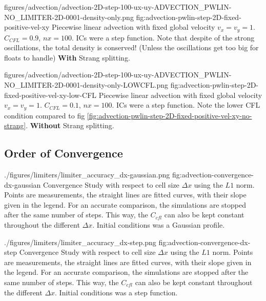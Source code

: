\quickfigcap
	{figures/advection/advection-2D-step-100-ux-uy-ADVECTION_PWLIN-NO_LIMITER-2D-0001-density-only.png}
	{fig:advection-pwlin-step-2D-fixed-positive-vel-xy}
	{	
		Piecewise linear advection with fixed global velocity $v_x = v_y = 1$. $C_{CFL} = 0.9$, $nx = 100$. 
		ICs were a step function. 
		Note that despite of the strong oscillations, the total density is conserved! 
		(Unless the oscillations get too big for floats to handle)
		\textbf{With} Strang splitting.
	}










\quickfigcap
	{figures/advection/advection-2D-step-100-ux-uy-ADVECTION_PWLIN-NO_LIMITER-2D-0001-density-only-LOWCFL.png}
	{fig:advection-pwlin-step-2D-fixed-positive-vel-xy-low-CFL}
	{
		Piecewise linear advection with fixed global velocity $v_x = v_y = 1$. 
		$C_{CFL} = 0.1$, $nx = 100$. 
		ICs were a step function. 
		Note the lower CFL condition compared to fig \ref{fig:advection-pwlin-step-2D-fixed-positive-vel-xy-no-strang}.
		\textbf{Without} Strang splitting.
	}


















\subsection{Order of Convergence}




\quickfigcap
	{./figures/limiters/limiter_accuracy_dx-gaussian.png}
	{fig:advection-convergence-dx-gaussian}
	{
		Convergence Study with respect to cell size $\Delta x$ using the $L1$ norm.
		Points are measurements, the straight lines are fitted curves, with their slope given in the legend.
		For an accurate comparison, the simulations are stopped after the same number of steps.
		This way, the $C_{cfl}$ can also be kept constant throughout the different $\Delta x$.
		Initial conditions was a Gaussian profile.
	}

\quickfigcap
	{./figures/limiters/limiter_accuracy_dx-step.png}
	{fig:advection-convergence-dx-step}
	{
		Convergence Study with respect to cell size $\Delta x$ using the $L1$ norm.
		Points are measurements, the straight lines are fitted curves, with their slope given in the legend.
		For an accurate comparison, the simulations are stopped after the same number of steps.
		This way, the $C_{cfl}$ can also be kept constant throughout the different $\Delta x$.
		Initial conditions was a step function.
	}
	



